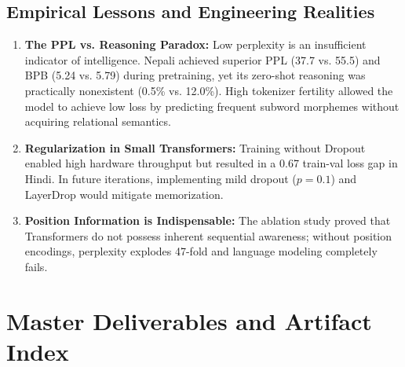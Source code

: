 \documentclass[10pt,a4paper]{article}
\begin{document}
\subsection{Empirical Lessons and Engineering Realities}
\begin{enumerate}[noitemsep,leftmargin=*]
    \item \textbf{The PPL vs. Reasoning Paradox:} Low perplexity is an insufficient indicator of intelligence. Nepali achieved superior PPL (37.7 vs. 55.5) and BPB (5.24 vs. 5.79) during pretraining, yet its zero-shot reasoning was practically nonexistent (0.5\% vs. 12.0\%). High tokenizer fertility allowed the model to achieve low loss by predicting frequent subword morphemes without acquiring relational semantics.
    \item \textbf{Regularization in Small Transformers:} Training without Dropout enabled high hardware throughput but resulted in a 0.67 train-val loss gap in Hindi. In future iterations, implementing mild dropout ($p=0.1$) and LayerDrop would mitigate memorization.
    \item \textbf{Position Information is Indispensable:} The ablation study proved that Transformers do not possess inherent sequential awareness; without position encodings, perplexity explodes 47-fold and language modeling completely fails.
\end{enumerate}

\section{Master Deliverables and Artifact Index}
\end{document}
